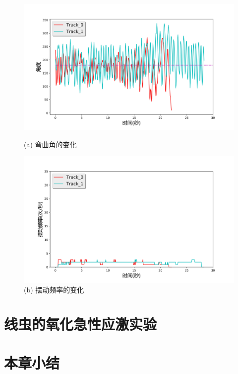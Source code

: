 \begin{figure}[!htp]    
\begin{minipage}[t]{0.5\linewidth}%
	\centering    
	\includegraphics[width=1\linewidth]{figure/chap3/angle.jpg}    
	\caption*{(a) 弯曲角的变化}%
	\label{fig:angle}    
\end{minipage}    
\begin{minipage}[t]{0.5\linewidth}%
	\centering    
	\includegraphics[width=1\linewidth]{figure/chap3/freq.jpg}    
	\caption*{(b) 摆动频率的变化}
	\label{fig:freq}
\end{minipage}
\end{figure}
\section{线虫的氧化急性应激实验}
\section{本章小结}